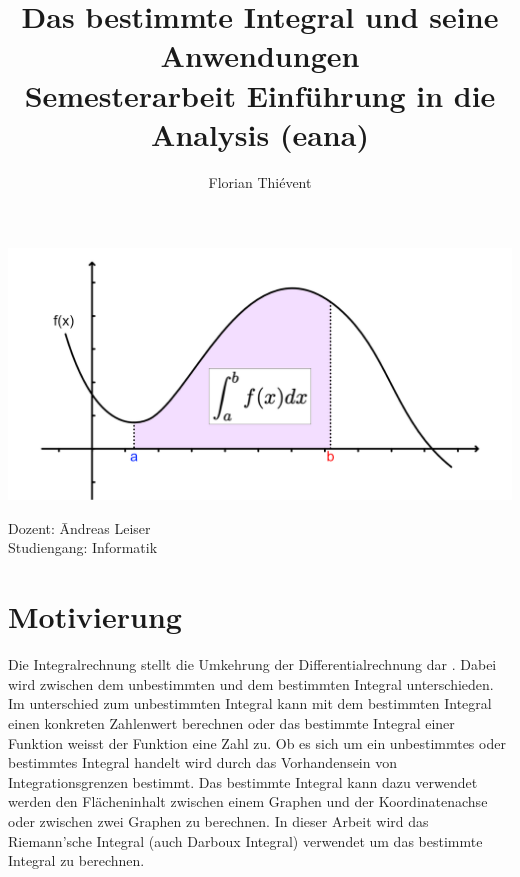 \documentclass{fhnwreport} %
\title{%
  {\huge Das bestimmte Integral und seine Anwendungen}\\[2ex]
  {\large Semesterarbeit Einführung in die Analysis (eana)}}
\author{Florian Thiévent}
\begin{document}
\maketitle

\vfill

\begin{minipage}{\textwidth}
\begin{center}
\vspace*{5ex}
\includegraphics{titelbild}
\end{center}
\end{minipage}

\vfill

\begin{tabbing}
Dozent: \hspace{2em} \= Andreas Leiser \\[2ex]
Studiengang: \> Informatik
\end{tabbing}


\hbox{}

\clearpage

\tableofcontents
\clearpage

\section{Motivierung}
Die Integralrechnung stellt die Umkehrung der Differentialrechnung dar \cite{Bosch2010}. Dabei wird zwischen dem unbestimmten und dem bestimmten Integral unterschieden. Im unterschied zum unbestimmten Integral kann mit dem bestimmten Integral einen konkreten Zahlenwert berechnen oder das bestimmte Integral einer Funktion weisst der Funktion eine Zahl zu. Ob es sich um ein unbestimmtes oder bestimmtes Integral handelt wird durch das Vorhandensein von Integrationsgrenzen bestimmt. Das bestimmte Integral kann dazu verwendet werden den Flächeninhalt zwischen einem Graphen und der Koordinatenachse oder zwischen zwei Graphen zu berechnen. In dieser Arbeit wird das Riemann'sche Integral (auch Darboux Integral) verwendet um das bestimmte Integral zu berechnen.
\end{document}

